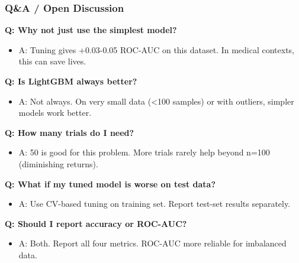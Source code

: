\documentclass{beamer}
\begin{document}
\begin{frame}[fragile]
\frametitle{Q\&A / Open Discussion}

\textbf{Q: Why not just use the simplest model?}
\begin{itemize}
    \item A: Tuning gives +0.03-0.05 ROC-AUC on this dataset. In medical contexts, this can save lives.
\end{itemize}

\textbf{Q: Is LightGBM always better?}
\begin{itemize}
    \item A: Not always. On very small data (<100 samples) or with outliers, simpler models work better.
\end{itemize}

\textbf{Q: How many trials do I need?}
\begin{itemize}
    \item A: 50 is good for this problem. More trials rarely help beyond n=100 (diminishing returns).
\end{itemize}

\textbf{Q: What if my tuned model is worse on test data?}
\begin{itemize}
    \item A: Use CV-based tuning on training set. Report test-set results separately.
\end{itemize}

\textbf{Q: Should I report accuracy or ROC-AUC?}
\begin{itemize}
    \item A: Both. Report all four metrics. ROC-AUC more reliable for imbalanced data.
\end{itemize}

\end{frame}
\end{document}
